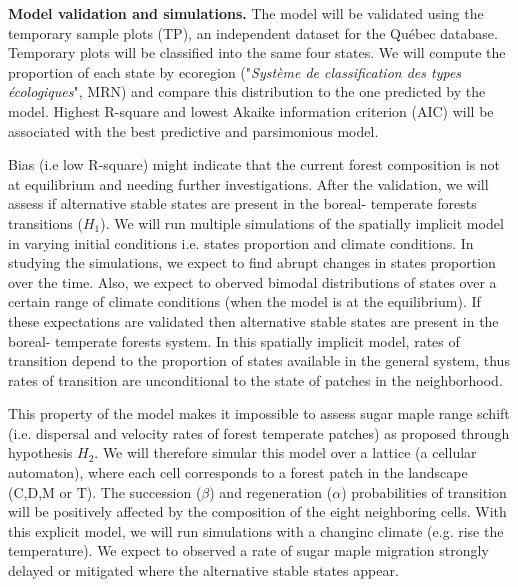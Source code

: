 \textbf{Model validation and simulations.}  The model will be validated using
the temporary sample plots (TP), an independent dataset for the Québec
database. Temporary plots will be classified into the same four states. We
will compute the proportion of each state by ecoregion ("\textit{Système de
classification des types écologiques}", MRN) and compare this distribution to
the one predicted by the model.  Highest R-square and lowest Akaike
information criterion (AIC) will be associated with the best predictive and
parsimonious model.


Bias (i.e low R-square) might indicate that the current forest composition is
not at equilibrium and needing further investigations. After the validation,
we will assess if alternative stable states are present in the boreal-
temperate forests transitions ($H_1$). We will run multiple simulations of the
spatially implicit model in varying initial conditions i.e. states proportion
and climate conditions. In studying the simulations, we expect to find abrupt
changes in states proportion over the time. Also, we expect to oberved bimodal
distributions of states over a certain range of climate conditions (when the
model is at the equilibrium). If these expectations are validated then
alternative stable states are present in the boreal- temperate forests system.
In this spatially implicit model, rates of transition depend to the proportion
of states available in the general system, thus rates of transition are
unconditional to the state of patches in the neighborhood.


This property of the model makes it impossible to assess sugar maple range
schift (i.e. dispersal and velocity rates of forest temperate patches) as
proposed through hypothesis $H_2$. We will therefore simular this model over a
lattice (a cellular automaton), where each cell corresponds to a forest patch
in the landscape (C,D,M or T). The succession ($\beta$) and regeneration
($\alpha$) probabilities of transition will be positively affected by the
composition of the eight neighboring cells.  With this explicit model, we will
run simulations with a changinc climate (e.g. rise the temperature). We expect
to observed a rate of sugar maple migration strongly delayed or mitigated
where the alternative stable states appear.


\clearpage

